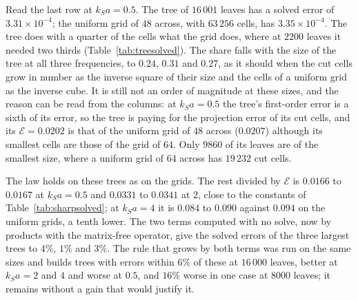 \documentclass[11pt,a4paper]{article}
\newcommand{\cE}{\mathcal{E}}
\begin{document}
Read the last row at $k_Sa=0.5$. The tree of $16\,001$ leaves has a solved error of
$3.31\times10^{-4}$; the uniform grid of $48$ across, with $63\,256$ cells, has $3.35\times10^{-4}$. The
tree does with a quarter of the cells what the grid does, where at $2200$ leaves it needed two thirds
(Table~\ref{tab:treesolved}). The share falls with the size of the tree at all three frequencies, to
$0.24$, $0.31$ and $0.27$, as it should when the cut cells grow in number as the inverse square of
their size and the cells of a uniform grid as the inverse cube. It is still not an order of magnitude at
these sizes, and the reason can be read from the columns: at $k_Sa=0.5$ the tree's first-order error is
a sixth of its error, so the tree is paying for the projection error of its cut cells, and its
$\cE=0.0202$ is that of the uniform grid of $48$ across ($0.0207$) although its smallest cells are those
of the grid of $64$. Only $9860$ of its leaves are of the smallest size, where a uniform grid of $64$
across has $19\,232$ cut cells.

The law holds on these trees as on the grids. The rest divided by $\cE$ is $0.0166$ to $0.0167$ at
$k_Sa=0.5$ and $0.0331$ to $0.0341$ at $2$, close to the constants of Table~\ref{tab:sharpsolved}; at $k_Sa=4$ it
is $0.084$ to $0.090$ against $0.094$ on the uniform grids, a tenth lower. The two terms computed with no
solve, now by products with the matrix-free operator, give the solved errors of the three largest trees
to $4\%$, $1\%$ and $3\%$. The rule that grows by both terms was run on the same sizes and builds trees
with errors within $6\%$ of these at $16\,000$ leaves, better at $k_Sa=2$ and $4$ and worse at $0.5$,
and $16\%$ worse in one case at $8000$ leaves; it remains without a gain that would justify it.
\end{document}
